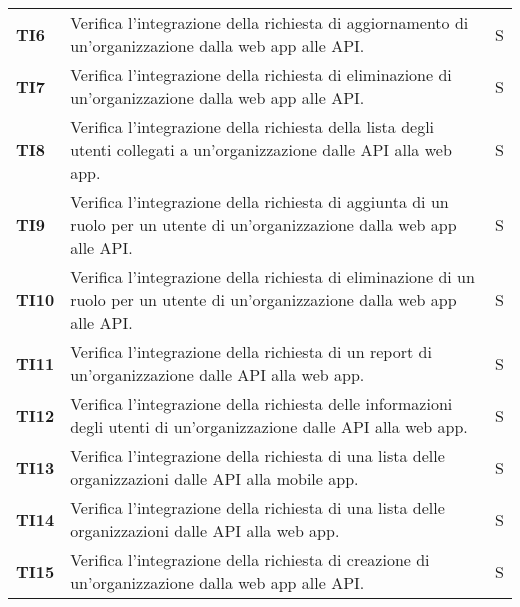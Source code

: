 \documentclass[../../piano-di-qualifica.tex]{subfiles}
\begin{document}
\begin{longtable}[H]{>{\centering\bfseries}m{3cm} >{}m{10cm} >{\centering\arraybackslash}m{3cm}}
  TI6                & Verifica l'integrazione della richiesta di aggiornamento di un'organizzazione dalla web app alle API\@.                                       & S                             \\

  TI7                & Verifica l'integrazione della richiesta di eliminazione di un'organizzazione dalla web app alle API\@.                                        & S                             \\

  TI8                & Verifica l'integrazione della richiesta della lista degli utenti collegati a un'organizzazione dalle API alla web app.                        & S                             \\

  TI9                & Verifica l'integrazione della richiesta di aggiunta di un ruolo per un utente di un'organizzazione dalla web app alle API\@.                  & S                             \\

  TI10               & Verifica l'integrazione della richiesta di eliminazione di un ruolo per un utente di un'organizzazione dalla web app alle API\@.              & S                             \\

  TI11               & Verifica l'integrazione della richiesta di un report di un'organizzazione dalle API alla web app.                                             & S                             \\

  TI12               & Verifica l'integrazione della richiesta delle informazioni degli utenti di un'organizzazione dalle API alla web app.                          & S                             \\

  TI13               & Verifica l'integrazione della richiesta di una lista delle organizzazioni dalle API alla mobile app.                                          & S                             \\

  TI14               & Verifica l'integrazione della richiesta di una lista delle organizzazioni dalle API alla web app.                                             & S                             \\

  TI15               & Verifica l'integrazione della richiesta di creazione di un'organizzazione dalla web app alle API\@.                                           & S                             \\


\end{longtable}
\end{document}
